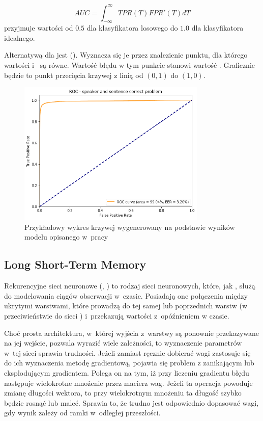 $$\mathit{AUC} = \int_{-\infty}^{\infty} \mathit{TPR}(T) \mathit{FPR}'(T) dT$$
 przyjmuje wartości od $0.5$ dla klasyfikatora losowego do $1.0$ dla klasyfikatora idealnego.

Alternatywą dla  jest  (). Wyznacza się je
przez znalezienie punktu, dla którego wartości  i~ są równe. Wartość błędu
w tym punkcie stanowi wartość . Graficznie będzie to punkt przecięcia krzywej 
z linią od $(0, 1)$ do $(1, 0)$.

\begin{figure}[H]
    \centering
    \includegraphics[width=0.8\textwidth]{images/2_2_b_roc_example}
    \caption{Przykładowy wykres krzywej  wygenerowany na podstawie wyników modelu  opisanego w~pracy}
    \label{fig:2_2_b_roc_example}
\end{figure}

\subsection{Long Short-Term Memory}

Rekurencyjne sieci neuronowe (, ) to rodzaj sieci neuronowych,
które, jak , służą do modelowania ciągów obserwacji w~czasie. Posiadają one połączenia między
ukrytymi warstwami, które prowadzą do tej samej lub poprzednich warstw
(w przeciwieństwie do sieci ) i~przekazują wartości z~opóźnieniem
w czasie\cite{onTheDifficulty}.

Choć prosta architektura, w~której wyjścia z~warstwy są ponownie przekazywane na jej wejście, pozwala
wyrazić wiele zależności, to wyznaczenie parametrów w~tej sieci sprawia trudności. Jeżeli zamiast
ręcznie dobierać wagi zastosuje się do ich wyznaczenia metodę gradientową, pojawia się problem
z zanikającym lub eksplodującym gradientem. Polega on na tym, iż przy liczeniu gradientu błędu
następuje wielokrotne mnożenie przez macierz wag. Jeżeli ta operacja powoduje zmianę długości
wektora, to przy wielokrotnym mnożeniu ta długość szybko będzie rosnąć lub maleć. Sprawia to,
że trudno jest odpowiednio dopasować wagi, gdy wynik zależy od ramki w~odległej przeszłości.


